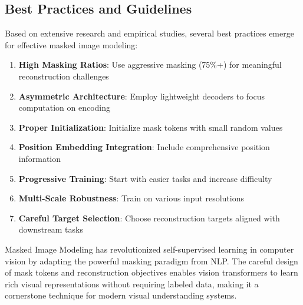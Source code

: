 \subsection{Best Practices and Guidelines}

Based on extensive research and empirical studies, several best practices emerge for effective masked image modeling:

\begin{enumerate}
\item \textbf{High Masking Ratios}: Use aggressive masking (75\%+) for meaningful reconstruction challenges
\item \textbf{Asymmetric Architecture}: Employ lightweight decoders to focus computation on encoding
\item \textbf{Proper Initialization}: Initialize mask tokens with small random values
\item \textbf{Position Embedding Integration}: Include comprehensive position information
\item \textbf{Progressive Training}: Start with easier tasks and increase difficulty
\item \textbf{Multi-Scale Robustness}: Train on various input resolutions
\item \textbf{Careful Target Selection}: Choose reconstruction targets aligned with downstream tasks
\end{enumerate}
\begin{comment}
Feedback: This is a great summary. To make it more actionable:
1.  **High Masking Ratios**: "Don't be afraid to use very high masking ratios like 75%
2.  **Asymmetric Architecture**: "For efficient pre-training, ensure your encoder *only* processes the visible patches. Passing the full sequence of visible and masked tokens through a deep encoder is computationally wasteful and misses the key optimization of MAE."
3.  **Careful Target Selection**: "If your downstream task is semantic (like classification), pre-training with a feature-level reconstruction target (like DINO features) can often lead to better fine-tuning performance than simple pixel-level reconstruction, even if the reconstructed images look less visually appealing."
\end{comment}

Masked Image Modeling has revolutionized self-supervised learning in computer vision by adapting the powerful masking paradigm from NLP. The careful design of mask tokens and reconstruction objectives enables vision transformers to learn rich visual representations without requiring labeled data, making it a cornerstone technique for modern visual understanding systems.